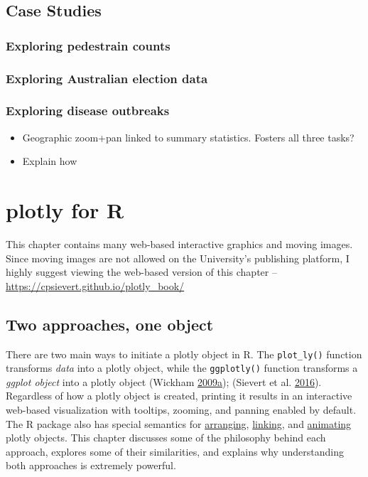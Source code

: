 \documentclass[12pt,]{isuthesis}
\providecommand{\tightlist}{%
  \setlength{\itemsep}{0pt}\setlength{\parskip}{0pt}}
\begin{document}
\section{Case Studies}\label{case-studies}

\subsection{Exploring pedestrain
counts}\label{exploring-pedestrain-counts}

\subsection{Exploring Australian election
data}\label{exploring-australian-election-data}

\subsection{Exploring disease
outbreaks}\label{exploring-disease-outbreaks}

\begin{itemize}
\tightlist
\item
  Geographic zoom+pan linked to summary statistics. Fosters all three
  tasks?
\item
  Explain how
\end{itemize}

\chapter{plotly for R}

This chapter contains many web-based interactive graphics and moving
images. Since moving images are not allowed on the University's
publishing platform, I highly suggest viewing the web-based version of
this chapter -- \url{https://cpsievert.github.io/plotly_book/}

\section{Two approaches, one object}\label{two-approaches-one-object}

There are two main ways to initiate a plotly object in R. The
\texttt{plot\_ly()} function transforms \emph{data} into a plotly
object, while the \texttt{ggplotly()} function transforms a \emph{ggplot
object} into a plotly object (Wickham
\protect\hyperlink{ref-ggplot2}{2009}\protect\hyperlink{ref-ggplot2}{a});
(Sievert et al. \protect\hyperlink{ref-plotly}{2016}). Regardless of how
a plotly object is created, printing it results in an interactive
web-based visualization with tooltips, zooming, and panning enabled by
default. The R package also has special semantics for
\protect\hyperlink{arranging-multiple-views}{arranging},
\protect\hyperlink{multiple-linked-views}{linking}, and
\protect\hyperlink{animating-views}{animating} plotly objects. This
chapter discusses some of the philosophy behind each approach, explores
some of their similarities, and explains why understanding both
approaches is extremely powerful.
\end{document}
